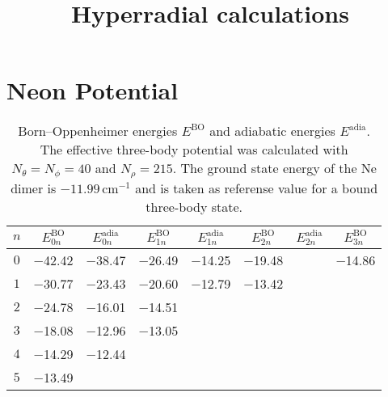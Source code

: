 \documentclass[]{article}
\title{Hyperradial calculations}
\author{}
\begin{document}
\maketitle

\section{Neon Potential}

\begin{table}[h!]
	\centering
	\footnotesize
	\begin{adjustwidth}{-0.1cm}{}
		\tabcolsep=0.10cm
		\begin{tabular}{||c c c c c c c c||} 
			\hline
			$n$ & $E^{\text{BO}}_{0n}$ & $E^{\text{adia}}_{0n}$ & $E^{\text{BO}}_{1n}$ & $E^{\text{adia}}_{1n}$ & $E^{\text{BO}}_{2n}$ & $E^{\text{adia}}_{2n}$ & $E^{\text{BO}}_{3n}$  \Tstrut\Bstrut \\ [0.7ex]
			\hline\hline  \Tstrut\Bstrut
			$0$   & $-$42.42  & $-$38.47 & $-$26.49 & $-$14.25 & $-$19.48 & & $-$14.86 \\
			$1$   & $-$30.77  & $-$23.43 & $-$20.60 & $-$12.79 & $-$13.42 & & \\
			$2$   & $-$24.78  & $-$16.01 & $-$14.51 & & & & \\
			$3$   & $-$18.08  & $-$12.96 & $-$13.05 & & & & \\
			$4$   & $-$14.29  & $-$12.44 & & & & & \\
			$5$   & $-$13.49  & & & & & & \\
			 [0.7ex]
			\hline 
		\end{tabular}
	\end{adjustwidth}
	\caption{Born--Oppenheimer energies $E^{\text{BO}}$ and adiabatic energies $E^{\text{adia}}$. The effective three-body potential was calculated with $N_{\theta}=N_{\phi} = 40$ and $N_{\rho}=215$. The ground state energy of the Ne dimer is  $-11.99 \, \text{cm}^{-1}$ and is taken as referense value for a bound three-body state.}
	\label{table:neon}
\end{table} 
\end{document}
